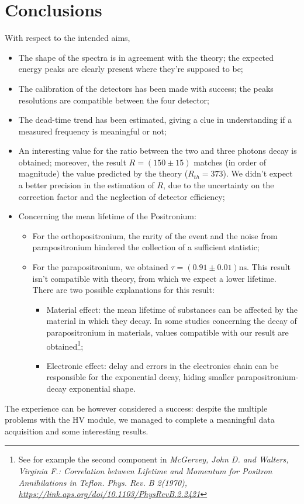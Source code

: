 \documentclass[11pt,a4 paper]{article}
\begin{document}
\section{Conclusions}
With respect to the intended aims,
\begin{itemize}[noitemsep]
    \item The shape of the spectra is in agreement with the theory; the expected energy peaks are clearly present where they're supposed to be;
    \item The calibration of the detectors has been made with success; the peaks resolutions are compatible between the four detector;
    \item The dead-time trend has been estimated, giving a clue in understanding if a measured frequency is meaningful or not;
    \item An interesting value for the ratio between the two and three photons decay is obtained; moreover, the result $R=(150\pm15)$ matches (in order of magnitude) the value predicted by the theory ($R_{th}=373$). We didn't expect a better precision in the estimation of $R$, due to the uncertainty on the correction factor and the neglection of detector efficiency;
    \item Concerning the mean lifetime of the Positronium:
    \begin{itemize}[noitemsep]
        \item For the orthopositronium, the rarity of the event and the noise from parapositronium hindered the collection of a sufficient statistic;
        \item For the parapositronium, we obtained $\tau = ( 0.91 \pm 0.01) \si{\nano\second}$. This result isn't compatible with theory, from which we expect a lower lifetime. There are two possible explanations for this result:
        \begin{itemize}[noitemsep]
            \item Material effect: the mean lifetime of substances can be affected by the material in which they decay. In some studies concerning the decay of parapositronium in materials, values compatible with our result are obtained\footnote{See for example the second component in \emph{McGervey, John D. and Walters, Virginia F.: Correlation between Lifetime and Momentum for Positron Annihilations in Teflon. Phys. Rev. B 2(1970), \url{https://link.aps.org/doi/10.1103/PhysRevB.2.2421}}};
            \item Electronic effect: delay and errors in the electronics chain can be responsible for the exponential decay, hiding smaller parapositronium-decay exponential shape.
        \end{itemize}
    \end{itemize}
\end{itemize}

The experience can be however considered a success: despite the multiple problems with the HV module, we managed to complete a meaningful data acquisition and some interesting results.
\end{document}
